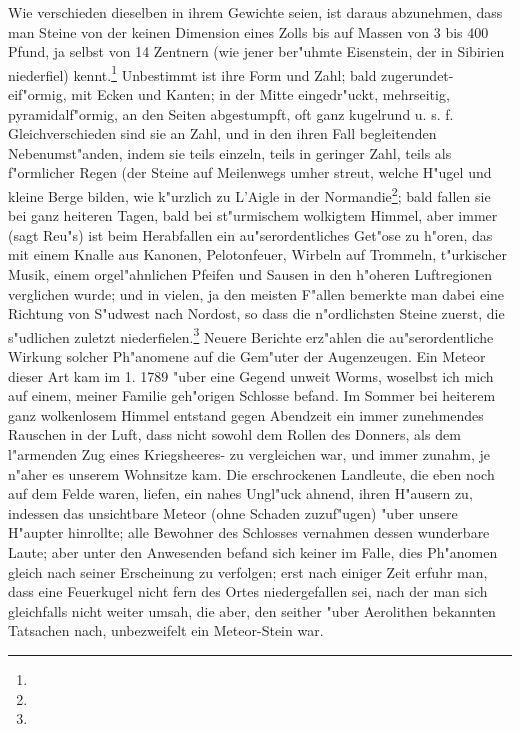 \documentclass[a4paper, 11pt, oneside, polutonikogreek, german]{article}
\begin{document}
Wie verschieden dieselben in ihrem Gewichte seien, ist daraus abzunehmen, dass man Steine von der keinen Dimension eines Zolls bis auf Massen von 3 bis 400 Pfund, ja selbst von 14 Zentnern (wie jener ber"uhmte Eisenstein, der in Sibirien niederfiel) kennt.\footnote{} Unbestimmt ist ihre Form und Zahl; bald zugerundet-eif"ormig, mit Ecken und Kanten; in der Mitte eingedr"uckt, mehrseitig, pyramidalf"ormig, an den Seiten abgestumpft, oft ganz kugelrund u. s. f. Gleichverschieden sind sie an Zahl, und in den ihren Fall begleitenden Nebenumst"anden, indem sie teils einzeln, teils in geringer Zahl, teils als f"ormlicher Regen (der Steine auf Meilenwegs umher streut, welche H"ugel und kleine Berge bilden, wie k"urzlich zu L’Aigle in der Normandie\footnote{}; bald fallen sie bei ganz heiteren Tagen, bald bei st"urmischem wolkigtem Himmel, aber immer (sagt Reu"s) ist beim Herabfallen ein au"serordentliches Get"ose zu h"oren, das mit einem Knalle aus Kanonen, Pelotonfeuer, Wirbeln auf Trommeln, t"urkischer Musik, einem orgel"ahnlichen Pfeifen und Sausen in den h"oheren Luftregionen verglichen wurde; und in vielen, ja den meisten F"allen bemerkte man dabei eine Richtung von S"udwest nach Nordost, so dass die n"ordlichsten Steine zuerst, die s"udlichen zuletzt niederfielen.\footnote{} Neuere Berichte erz"ahlen die au"serordentliche Wirkung solcher Ph"anomene auf die Gem"uter der Augenzeugen. Ein Meteor dieser Art kam im 1. 1789 "uber eine Gegend unweit Worms, woselbst ich mich auf einem, meiner Familie geh"origen Schlosse befand. Im Sommer bei heiterem ganz wolkenlosem Himmel entstand gegen Abendzeit ein immer zunehmendes Rauschen in der Luft, dass nicht sowohl dem Rollen des Donners, als dem l"armenden Zug eines Kriegsheeres- zu vergleichen war, und immer zunahm, je n"aher es unserem Wohnsitze kam. Die erschrockenen Landleute, die eben noch auf dem Felde waren, liefen, ein nahes Ungl"uck ahnend, ihren H"ausern zu, indessen das unsichtbare Meteor (ohne Schaden zuzuf"ugen) "uber unsere H"aupter hinrollte; alle Bewohner des Schlosses vernahmen dessen wunderbare Laute; aber unter den Anwesenden befand sich keiner im Falle, dies Ph"anomen gleich nach seiner Erscheinung zu verfolgen; erst nach einiger Zeit erfuhr man, dass eine Feuerkugel nicht fern des Ortes niedergefallen sei, nach der man sich gleichfalls nicht weiter umsah, die aber, den seither "uber Aerolithen bekannten Tatsachen nach, unbezweifelt ein Meteor-Stein war.
\end{document}
